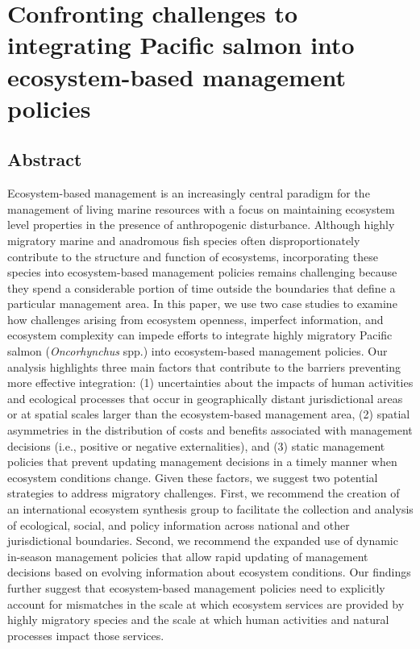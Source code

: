 
\chapter[Integrating salmon into ecosystem-based management
  policies]{Confronting challenges to integrating Pacific salmon into
  ecosystem-based management policies\footnotemark[1]}
\label{ch:ebm}



\section{Abstract}

Ecosystem-based management is an increasingly central paradigm for the
management of living marine resources with a focus on maintaining ecosystem
level properties in the presence of anthropogenic disturbance. Although highly
migratory marine and anadromous fish species often disproportionately contribute
to the structure and function of ecosystems, incorporating these species into
ecosystem-based management policies remains challenging because they spend a
considerable portion of time outside the boundaries that define a particular
management area. In this paper, we use two case studies to examine how
challenges arising from ecosystem openness, imperfect information, and ecosystem
complexity can impede efforts to integrate highly migratory Pacific salmon
(\emph{Oncorhynchus} spp.) into ecosystem-based management policies. Our
analysis highlights three main factors that contribute to the barriers
preventing more effective integration: (1) uncertainties about the impacts of
human activities and ecological processes that occur in geographically distant
jurisdictional areas or at spatial scales larger than the ecosystem-based
management area, (2) spatial asymmetries in the distribution of costs and
benefits associated with management decisions (i.e., positive or negative
externalities), and (3) static management policies that prevent updating
management decisions in a timely manner when ecosystem conditions change. Given
these factors, we suggest two potential strategies to address migratory
challenges. First, we recommend the creation of an international ecosystem
synthesis group to facilitate the collection and analysis of ecological, social,
and policy information across national and other jurisdictional boundaries.
Second, we recommend the expanded use of dynamic in-season management policies
that allow rapid updating of management decisions based on evolving information
about ecosystem conditions. Our findings further suggest that ecosystem-based
management policies need to explicitly account for mismatches in the scale at
which ecosystem services are provided by highly migratory species and the scale
at which human activities and natural processes impact those services.



